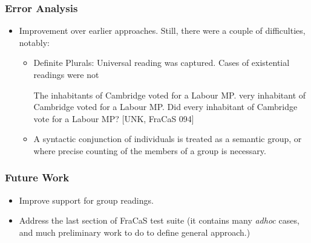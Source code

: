 \documentclass[11pt]{beamer}
\begin{document}
\begin{frame}
  \frametitle{Error Analysis}
  
  \begin{itemize}
  \item	Improvement over earlier approaches. Still, there were a couple of difficulties, notably:
    \begin{itemize}
    \item Definite Plurals: Universal reading was captured. Cases of existential readings were not
      \begin{exe}
	\ex	
        \hskip 0.05in The inhabitants of Cambridge voted for a Labour MP.
        \hskip 0.05in very inhabitant of Cambridge voted for a Labour MP.
        \hskip 0.05in  	Did every inhabitant of Cambridge vote for a Labour MP? [UNK, FraCaS 094]			
      \end{exe}
    \item A syntactic conjunction of individuals is treated as a
      semantic group, or where precise counting of the members of a
      group is necessary.
    \end{itemize}\end{itemize}

\end{frame}	







\begin{frame}
  \frametitle{Future Work}
  \begin{itemize}
    \item Improve support for group readings.
    \item Address the last section of FraCaS test suite (it contains
      many \textit{adhoc} cases, and much preliminary work to do to
      define general approach.)
  \end{itemize}
\end{frame}
\end{document}
